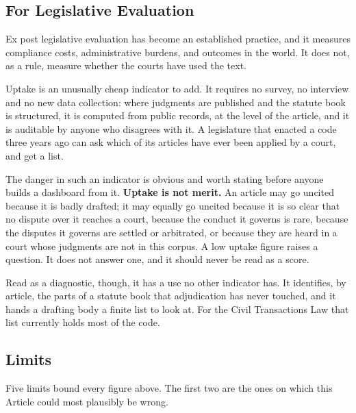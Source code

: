 \documentclass[12pt]{article}
\begin{document}
\subsection{For Legislative Evaluation}

Ex post legislative evaluation has become an established practice, and it
measures compliance costs, administrative burdens, and outcomes in the world.
It does not, as a rule, measure whether the courts have used the text.

Uptake is an unusually cheap indicator to add. It requires no survey, no
interview and no new data collection: where judgments are published and the
statute book is structured, it is computed from public records, at the level
of the article, and it is auditable by anyone who disagrees with it. A
legislature that enacted a code three years ago can ask which of its articles
have ever been applied by a court, and get a list.

The danger in such an indicator is obvious and worth stating before anyone
builds a dashboard from it. \textbf{Uptake is not merit.} An article may go
uncited because it is badly drafted; it may equally go uncited because it is
so clear that no dispute over it reaches a court, because the conduct it
governs is rare, because the disputes it governs are settled or arbitrated, or
because they are heard in a court whose judgments are not in this corpus. A
low uptake figure raises a question. It does not answer one, and it should
never be read as a score.

Read as a diagnostic, though, it has a use no other indicator has. It
identifies, by article, the parts of a statute book that adjudication has
never touched, and it hands a drafting body a finite list to look at. For the
Civil Transactions Law that list currently holds most of the code.

\subsection{Limits}

Five limits bound every figure above. The first two are the ones on which this
Article could most plausibly be wrong.
\end{document}
